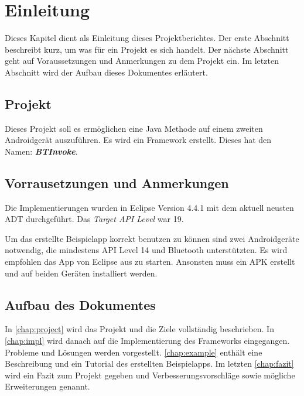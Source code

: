 \chapter{Einleitung}
%
Dieses Kapitel dient als Einleitung dieses Projektberichtes. Der erste Abschnitt beschreibt kurz, um was für ein Projekt es sich handelt. Der nächste Abschnitt geht auf Voraussetzungen und Anmerkungen zu dem Projekt ein. Im letzten Abschnitt wird der Aufbau dieses Dokumentes erläutert.
\section{Projekt}
%
Dieses Projekt soll es ermöglichen eine Java Methode auf einem zweiten Androidgerät auszuführen. Es wird ein Framework erstellt. Dieses hat den Namen: \emph{\textbf{BTInvoke}}.
%
\section{Vorrausetzungen und Anmerkungen}
%
Die Implementierungen wurden in Eclipse Version 4.4.1 mit dem aktuell neusten ADT durchgeführt. Das \emph{Target API Level} war 19.

Um das erstellte Beispielapp korrekt benutzen zu können sind zwei Androidgeräte notwendig, die mindestens API Level 14 und Bluetooth unterstützten. Es wird empfohlen das App von Eclipse aus zu starten. Ansonsten muss ein APK erstellt und auf beiden Geräten installiert werden.
%
\section{Aufbau des Dokumentes}
%
In \autoref{chap:project} wird das Projekt und die Ziele vollständig beschrieben. In \autoref{chap:impl} wird danach auf die Implementierung des Frameworks eingegangen. Probleme und Lösungen werden vorgestellt. \autoref{chap:example} enthält eine Beschreibung und ein Tutorial des erstellten Beispielapps. Im letzten \autoref{chap:fazit} wird ein Fazit zum Projekt gegeben und Verbesserungsvorschläge sowie mögliche Erweiterungen genannt. 
%
%
